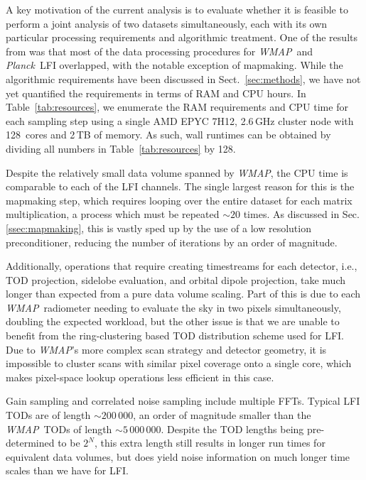 \documentclass[twocolumn]{../../common/aa}
\def\WMAP{\emph{WMAP}}
\def\Planck{\emph{Planck}}
\begin{document}
A key motivation of the current analysis is to evaluate whether it is feasible to perform a joint analysis of two datasets simultaneously, each with its own particular processing requirements and algorithmic treatment. One of the results from \citet{bp17} was that most of the data processing procedures for  \WMAP\ and \Planck\ LFI overlapped, with the notable exception of mapmaking. While the algorithmic requirements have been discussed in Sect.~\ref{sec:methods}, we have not yet quantified the requirements in terms of RAM and CPU hours. In Table~\ref{tab:resources}, we enumerate the RAM requirements and CPU time for each sampling step using a single AMD EPYC 7H12, 2.6\,GHz cluster node with 128~cores and 2\,TB of memory. As such, wall runtimes can be obtained by dividing all numbers in Table~\ref{tab:resources} by 128.

Despite the relatively small data volume spanned by \WMAP, the CPU time is comparable to each of the LFI channels.  The single largest reason for this is the mapmaking step, which requires looping over the entire dataset for each matrix multiplication, a process which must be repeated $\sim20$ times. As discussed in Sec. \ref{ssec:mapmaking}, this is vastly sped up by the use of a low resolution preconditioner, reducing the number of iterations by an order of magnitude.


Additionally, operations that require creating timestreams for each detector, i.e., TOD projection, sidelobe evaluation, and orbital dipole projection, take much longer than expected from a pure data volume scaling. Part of this is due to each \WMAP\ radiometer needing to evaluate the sky in two pixels simultaneously, doubling the expected workload, but the other issue is that we are unable to benefit from the ring-clustering based TOD distribution scheme used for LFI. Due to \WMAP's more complex scan strategy and detector geometry, it is impossible to cluster scans with similar pixel coverage onto a single core, which makes pixel-space lookup operations less efficient in this case.

Gain sampling and correlated noise sampling include multiple FFTs. Typical LFI TODs are of length $\sim200\,000$, an order of magnitude smaller than the \WMAP\ TODs of length $\sim5\,000\,000$. Despite the TOD lengths being pre-determined to be $2^N$, this extra length still results in longer run times for equivalent data volumes, but does yield noise information on much longer time scales than we have for LFI.  
\end{document}
